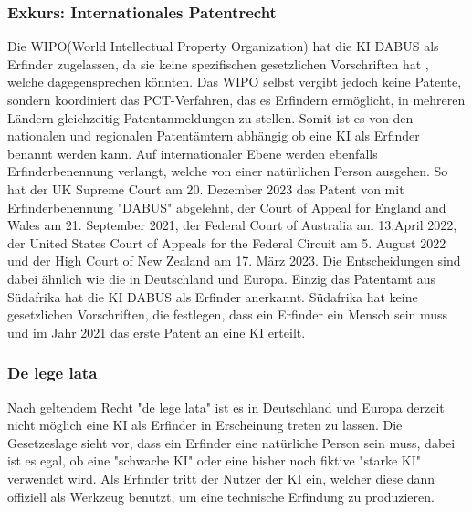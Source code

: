 \subsubsection{Exkurs: Internationales Patentrecht\label{sec:intp}}
Die WIPO(World Intellectual Property Organization) 
hat die KI DABUS als Erfinder zugelassen,
da sie keine spezifischen gesetzlichen Vorschriften hat
, welche dagegensprechen könnten. 
Das WIPO
selbst vergibt jedoch keine Patente, 
sondern koordiniert das PCT-Verfahren, 
das es Erfindern ermöglicht, 
in mehreren Ländern gleichzeitig 
Patentanmeldungen zu stellen. 
Somit ist es
von den nationalen und regionalen Patentämtern abhängig
ob eine KI als Erfinder benannt werden kann.
Auf internationaler Ebene werden ebenfalls Erfinderbenennung verlangt,
welche von einer natürlichen Person ausgehen. So hat 
der UK Supreme Court am 20. Dezember 2023 das Patent von mit 
Erfinderbenennung "DABUS" abgelehnt, der Court of Appeal for England
and Wales am 21. September 2021,
der Federal Court of Australia am 13.April 2022,
der United States Court of Appeals for the
Federal Circuit am 5. August 2022 
und  der High Court of New
Zealand am 17. März 2023.
Die Entscheidungen sind dabei ähnlich wie die 
in Deutschland und Europa.
Einzig das Patentamt aus 
Südafrika hat die KI DABUS als Erfinder anerkannt.
Südafrika hat keine gesetzlichen Vorschriften, 
die festlegen, 
dass ein Erfinder ein Mensch sein muss und im Jahr 2021 das
erste Patent an eine KI erteilt.


\subsubsection{De lege lata}
Nach geltendem Recht "de lege lata" ist es in Deutschland und Europa
derzeit nicht möglich eine KI 
als Erfinder in Erscheinung treten zu lassen.
Die Gesetzeslage sieht vor, 
dass ein Erfinder eine natürliche Person sein muss,
dabei ist es egal, ob eine "schwache KI" oder eine 
bisher noch fiktive "starke KI" verwendet wird.
Als Erfinder tritt der Nutzer der KI ein, 
welcher diese dann offiziell
als Werkzeug benutzt,
um eine technische Erfindung zu produzieren.


